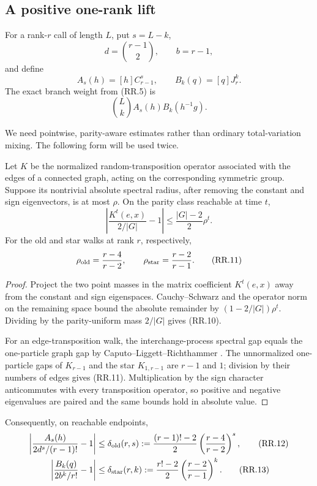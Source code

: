 \subsection{A positive one-rank lift}

For a rank-$r$ call of length $L$, put $s=L-k$,
\[
  d=\binom{r-1}{2},\qquad b=r-1,
\]
and define
\[
  A_s(h)=[h]C_{r-1}^s,\qquad B_k(q)=[q]J_r^k.
\]
The exact branch weight from (RR.5) is
\[
  \binom{L}{k}A_s(h)B_k(h^{-1}g).
  \tag{RR.9}
\]

We need pointwise, parity-aware estimates rather than ordinary total-variation
mixing.  The following form will be used twice.

\begin{lemma}
\label{lem:pointwise-smoothing}
Let $K$ be the normalized random-transposition operator associated with the
edges of a connected graph, acting on the corresponding symmetric group.
Suppose its nontrivial absolute spectral radius, after removing the constant
and sign eigenvectors, is at most $\rho$.  On the parity class reachable at
time $t$,
\[
  \left|
    \frac{K^t(e,x)}{2/|G|}-1
  \right|
  \le \frac{|G|-2}{2}\rho^t.
  \tag{RR.10}
\]
For the old and star walks at rank $r$, respectively,
\[
  \rho_{\rm old}=\frac{r-4}{r-2},
  \qquad
  \rho_{\rm star}=\frac{r-2}{r-1}.
  \tag{RR.11}
\]
\end{lemma}

\begin{proof}
Project the two point masses in the matrix coefficient $K^t(e,x)$ away from
the constant and sign eigenspaces.  Cauchy--Schwarz and the operator norm on
the remaining space bound the absolute remainder by
$(1-2/|G|)\rho^t$.  Dividing by the parity-uniform mass $2/|G|$ gives
(RR.10).

For an edge-transposition walk, the interchange-process spectral gap equals
the one-particle graph gap by Caputo--Liggett--Richthammer
\cite[Theorem 1.1]{CLR2010}.  The unnormalized one-particle gaps of
$K_{r-1}$ and the star $K_{1,r-1}$ are $r-1$ and $1$; division by their
numbers of edges gives (RR.11).  Multiplication by the sign character
anticommutes with every transposition operator, so positive and negative
eigenvalues are paired and the same bounds hold in absolute value.
\end{proof}

Consequently, on reachable endpoints,
\begin{align}
  \left|
  \frac{A_s(h)}{2d^s/(r-1)!}-1
  \right|
  &\le
  \delta_{\rm old}(r,s)
  :=
  \frac{(r-1)!-2}{2}
  \left(\frac{r-4}{r-2}\right)^s,
  \tag{RR.12}\\
  \left|
  \frac{B_k(q)}{2b^k/r!}-1
  \right|
  &\le
  \delta_{\rm star}(r,k)
  :=
  \frac{r!-2}{2}
  \left(\frac{r-2}{r-1}\right)^k.
  \tag{RR.13}
\end{align}

